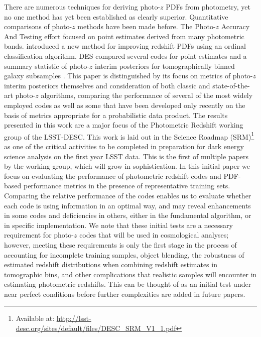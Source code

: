There are numerous techniques for deriving photo-$z$ PDFs from photometry, yet no one method has yet been established as clearly superior.
Quantitative comparisons of photo-$z$ methods have been made before.
The Photo-$z$ Accuracy And Testing \citep[PHAT,][]{Hildebrandt:10} effort focused on point estimates derived from many photometric bands.  \citet{Rau:2015} introduced a new method for improving redshift PDFs using an ordinal classification algorithm.
DES compared several codes for point estimates \citep{Sanchez:14} and a summary statistic of photo-$z$ interim posteriors for tomographically binned galaxy subsamples \citep{Bonnett:16}.  
This paper is distinguished by its focus on metrics of photo-$z$ interim posteriors themselves and consideration of both classic and state-of-the-art photo-$z$ algorithms, comparing the performance of several of the most widely employed codes as well as some that have been developed only recently on the basis of metrics appropriate for a probabilistic data product.
The results presented in this work are
a major focus of the Photometric Redshift working group of the LSST-DESC.
This work is laid out in the Science Roadmap (SRM)\footnote{Available at: \url{http://lsst-desc.org/sites/default/files/DESC_SRM_V1_1.pdf}} as one of the critical activities to be completed in preparation for dark energy science analysis on the first year LSST data.
This is the first of multiple papers by the working group, which will grow in sophistication.
In this initial paper we focus on evaluating the performance of photometric redshift codes and PDF-based performance metrics in the presence of representative training sets.
Comparing the relative performance of the codes enables us to evaluate whether each code is using information in an optimal way, and may reveal enhancements in some codes and deficiencies in others, either in the fundamental algorithm, or in specific implementation.  We note that these initial tests are a necessary requirement for photo-$z$ codes that will be used in cosmological analyses; however, meeting these requirements is only the first stage in the process of accounting for incomplete training samples, object blending,  the robustness of estimated redshift distributions when combining redshift estimates in tomographic bins, and other complications that realistic samples will encounter in estimating photometric redshifts.  This can be thought of as an initial test under near perfect conditions before further complexities are added in future papers.


